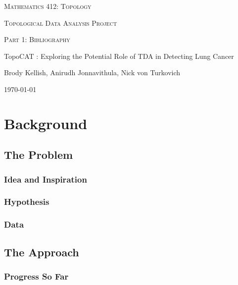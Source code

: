 \documentclass[12pt]{report}
\begin{document}

\begin{titlepage}
	\centering
	
{\scshape\LARGE Mathematics 412: Topology \par}
	{\scshape\Large Topological Data Analysis Project\par}
	{\scshape\Large Part 1: Bibliography\par}
	\vspace{1.5cm}
	{\Large TopoCAT : Exploring the Potential Role of TDA in Detecting Lung Cancer\par}
	\vspace{2cm}
	
	{\normalsize Brody Kellish, Anirudh Jonnavithula, Nick von Turkovich\par}
	\vfill


	{\large \today\par}
\end{titlepage}
\newpage

\tableofcontents{}

\part{Background}

\chapter{The Problem}

\section{Idea and Inspiration}

\section{Hypothesis}

\section{Data}

\chapter{The Approach}

\section{Progress So Far}
\end{document}
